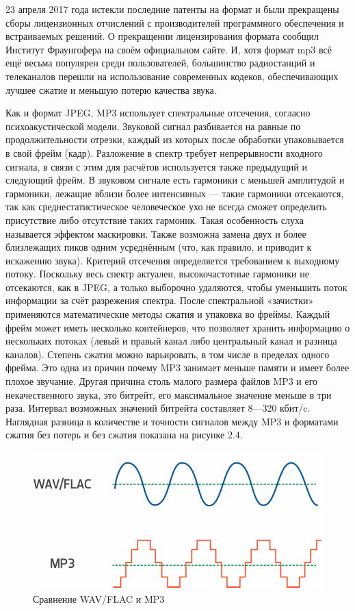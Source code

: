\documentclass[12pt,a4paper,oneside]{report}
\begin{document}
23 апреля 2017 года истекли последние патенты на формат и были прекращены сборы лицензионных отчислений с производителей программного обеспечения и встраиваемых решений. О прекращении лицензирования формата сообщил Институт Фраунгофера на своём официальном сайте. И, хотя формат mp3 всё ещё весьма популярен среди пользователей, большинство радиостанций и телеканалов перешли на использование современных кодеков, обеспечивающих лучшее сжатие и меньшую потерю качества звука.

Как и формат JPEG, MP3 использует спектральные отсечения, согласно психоакустической модели. Звуковой сигнал разбивается на равные по продолжительности отрезки, каждый из которых после обработки упаковывается в свой фрейм (кадр)\cite{three}. Разложение в спектр требует непрерывности входного сигнала, в связи с этим для расчётов используется также предыдущий и следующий фрейм. В звуковом сигнале есть гармоники с меньшей амплитудой и гармоники, лежащие вблизи более интенсивных — такие гармоники отсекаются, так как среднестатистическое человеческое ухо не всегда сможет определить присутствие либо отсутствие таких гармоник. Такая особенность слуха называется эффектом маскировки. Также возможна замена двух и более близлежащих пиков одним усреднённым (что, как правило, и приводит к искажению звука). Критерий отсечения определяется требованием к выходному потоку. Поскольку весь спектр актуален, высокочастотные гармоники не отсекаются, как в JPEG, а только выборочно удаляются, чтобы уменьшить поток информации за счёт разрежения спектра. После спектральной «зачистки» применяются математические методы сжатия и упаковка во фреймы. Каждый фрейм может иметь несколько контейнеров, что позволяет хранить информацию о нескольких потоках (левый и правый канал либо центральный канал и разница каналов). Степень сжатия можно варьировать, в том числе в пределах одного фрейма\cite{five}. Это одна из причин почему MP3 занимает меньше памяти и имеет более плохое звучание. Другая причина столь малого размера файлов MP3 и его некачественного звука, это битрейт, его максимальное значение меньше в три раза. Интервал возможных значений битрейта составляет 8—320 кбит/c. Наглядная разница в  количестве и точности сигналов между MP3 и форматами сжатия без потерь и без сжатия показана на рисунке 2.4.

\begin{figure}[!htbp]
	\centering
	\includegraphics[scale=0.5]{mp3kek.png}
	\caption{Сравнение WAV/FLAC и MP3}
	\label{ris:mp3kek}
\end{figure}
\end{document}
